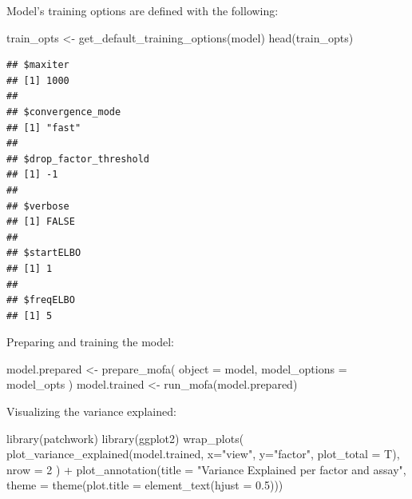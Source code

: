 \documentclass[
]{book}
\newenvironment{Shaded}{\begin{snugshade}}{\end{snugshade}}
\newcommand{\AttributeTok}[1]{\textcolor[rgb]{0.77,0.63,0.00}{#1}}
\newcommand{\DecValTok}[1]{\textcolor[rgb]{0.00,0.00,0.81}{#1}}
\newcommand{\FloatTok}[1]{\textcolor[rgb]{0.00,0.00,0.81}{#1}}
\newcommand{\FunctionTok}[1]{\textcolor[rgb]{0.00,0.00,0.00}{#1}}
\newcommand{\NormalTok}[1]{#1}
\newcommand{\OtherTok}[1]{\textcolor[rgb]{0.56,0.35,0.01}{#1}}
\newcommand{\SpecialCharTok}[1]{\textcolor[rgb]{0.00,0.00,0.00}{#1}}
\newcommand{\StringTok}[1]{\textcolor[rgb]{0.31,0.60,0.02}{#1}}
\begin{document}
Model's training options are defined with the following:

\begin{Shaded}
\begin{Highlighting}[]
\NormalTok{train\_opts }\OtherTok{\textless{}{-}} \FunctionTok{get\_default\_training\_options}\NormalTok{(model)}
\FunctionTok{head}\NormalTok{(train\_opts)}
\end{Highlighting}
\end{Shaded}

\begin{verbatim}
## $maxiter
## [1] 1000
## 
## $convergence_mode
## [1] "fast"
## 
## $drop_factor_threshold
## [1] -1
## 
## $verbose
## [1] FALSE
## 
## $startELBO
## [1] 1
## 
## $freqELBO
## [1] 5
\end{verbatim}

Preparing and training the model:

\begin{Shaded}
\begin{Highlighting}[]
\NormalTok{model.prepared }\OtherTok{\textless{}{-}} \FunctionTok{prepare\_mofa}\NormalTok{(}
  \AttributeTok{object =}\NormalTok{ model,}
  \AttributeTok{model\_options =}\NormalTok{ model\_opts}
\NormalTok{)}
\NormalTok{model.trained }\OtherTok{\textless{}{-}} \FunctionTok{run\_mofa}\NormalTok{(model.prepared)}
\end{Highlighting}
\end{Shaded}

Visualizing the variance explained:

\begin{Shaded}
\begin{Highlighting}[]
\FunctionTok{library}\NormalTok{(patchwork)}
\FunctionTok{library}\NormalTok{(ggplot2)}
\FunctionTok{wrap\_plots}\NormalTok{(}
    \FunctionTok{plot\_variance\_explained}\NormalTok{(model.trained, }\AttributeTok{x=}\StringTok{"view"}\NormalTok{, }\AttributeTok{y=}\StringTok{"factor"}\NormalTok{, }\AttributeTok{plot\_total =}\NormalTok{ T),}
    \AttributeTok{nrow =} \DecValTok{2}
\NormalTok{) }\SpecialCharTok{+} \FunctionTok{plot\_annotation}\NormalTok{(}\AttributeTok{title =} \StringTok{"Variance Explained per factor and assay"}\NormalTok{,}
                    \AttributeTok{theme =} \FunctionTok{theme}\NormalTok{(}\AttributeTok{plot.title =} \FunctionTok{element\_text}\NormalTok{(}\AttributeTok{hjust =} \FloatTok{0.5}\NormalTok{)))}
\end{Highlighting}
\end{Shaded}
\end{document}
